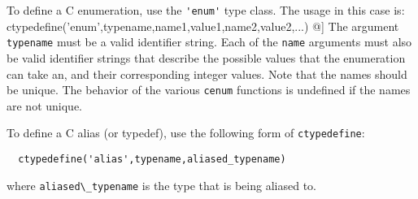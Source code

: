 To define a C enumeration, use the \verb|'enum'| type class.  The usage
in this case is:
  ctypedefine('enum',typename,name1,value1,name2,value2,...)
@]
The argument \verb|typename| must be a valid identifier string.  Each of the
\verb|name| arguments must also be valid identifier strings that describe
the possible values that the enumeration can take an, and their corresponding
integer values.  Note that the names should be unique.  The behavior of
the various \verb|cenum| functions is undefined if the names are not unique.

To define a C alias (or typedef), use the following form of \verb|ctypedefine|:
\begin{verbatim}
  ctypedefine('alias',typename,aliased_typename)
\end{verbatim}
where \verb|aliased\_typename| is the type that is being aliased to.
